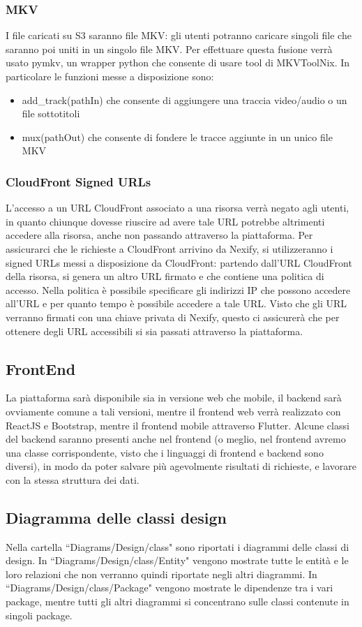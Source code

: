 \subsubsection{MKV}
I file caricati su S3 saranno file MKV: gli utenti potranno caricare singoli file che saranno poi uniti in un singolo file MKV. Per effettuare questa fusione verrà usato pymkv, un wrapper python che consente di usare tool di MKVToolNix. In particolare le funzioni messe a disposizione sono:
\begin{itemize}
\item add\_track(pathIn) che consente di aggiungere una traccia video/audio o un file sottotitoli
\item mux(pathOut) che consente di fondere le tracce aggiunte in un unico file MKV
\end{itemize}
\subsubsection{CloudFront Signed URLs}
L'accesso a un URL CloudFront associato a una risorsa verrà negato agli utenti, in quanto chiunque dovesse riuscire ad avere tale URL potrebbe altrimenti accedere alla risorsa, anche non passando attraverso la piattaforma. Per assicurarci che le richieste a CloudFront arrivino da Nexify, si utilizzeranno i signed URLs messi a disposizione da CloudFront: partendo dall'URL CloudFront della risorsa, si genera un altro URL firmato e che contiene una politica di accesso. Nella politica è possibile specificare gli indirizzi IP che possono accedere all'URL e per quanto tempo è possibile accedere a tale URL. Visto che gli URL verranno firmati con una chiave privata di Nexify, questo ci assicurerà che per ottenere degli URL accessibili si sia passati attraverso la piattaforma.
\subsection{FrontEnd}
La piattaforma sarà disponibile sia in versione web che mobile, il backend sarà ovviamente comune a tali versioni, mentre il frontend web verrà realizzato con ReactJS e Bootstrap, mentre il frontend mobile attraverso Flutter. Alcune classi del backend saranno presenti anche nel frontend (o meglio, nel frontend avremo una classe corrispondente, visto che i linguaggi di frontend e backend sono diversi), in modo da poter salvare più agevolmente risultati di richieste, e lavorare con la stessa struttura dei dati.
\subsection{Diagramma delle classi design}
Nella cartella ``Diagrams/Design/class" sono riportati i diagrammi delle classi di design. In ``Diagrams/Design/class/Entity" vengono mostrate tutte le entità e le loro relazioni che non verranno quindi riportate negli altri diagrammi. In ``Diagrams/Design/class/Package" vengono mostrate le dipendenze tra i vari package, mentre tutti gli altri diagrammi si concentrano sulle classi contenute in singoli package.
